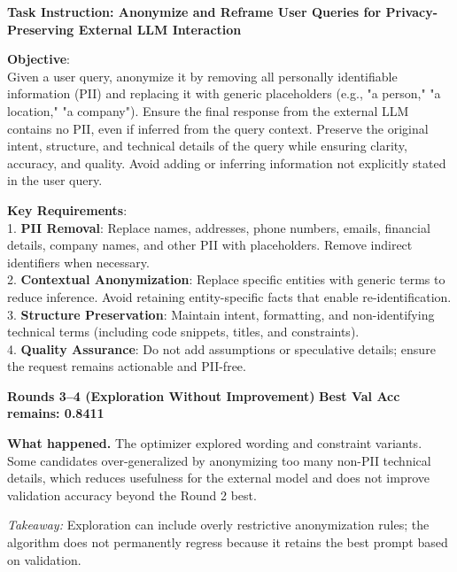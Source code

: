 \begin{prompttext}
\textbf{Task Instruction: Anonymize and Reframe User Queries for Privacy-Preserving External LLM Interaction}

\textbf{Objective}: \\
Given a user query, anonymize it by removing all personally identifiable information (PII) and replacing it with generic placeholders (e.g., "a person," "a location," "a company"). Ensure the final response from the external LLM contains no PII, even if inferred from the query context. Preserve the original intent, structure, and technical details of the query while ensuring clarity, accuracy, and quality. Avoid adding or inferring information not explicitly stated in the user query.

\textbf{Key Requirements}: \\
1. \textbf{PII Removal}: Replace names, addresses, phone numbers, emails, financial details, company names, and other PII with placeholders. Remove indirect identifiers when necessary. \\
2. \textbf{Contextual Anonymization}: Replace specific entities with generic terms to reduce inference. Avoid retaining entity-specific facts that enable re-identification. \\
3. \textbf{Structure Preservation}: Maintain intent, formatting, and non-identifying technical terms (including code snippets, titles, and constraints). \\
4. \textbf{Quality Assurance}: Do not add assumptions or speculative details; ensure the request remains actionable and PII-free.
\end{prompttext}

\begin{roundbox}
\textbf{Rounds 3--4 (Exploration Without Improvement)} \hfill \textbf{Best Val Acc remains: 0.8411}
\end{roundbox}

\noindent \textbf{What happened.} The optimizer explored wording and constraint variants. Some candidates over-generalized by anonymizing too many non-PII technical details, which reduces usefulness for the external model and does not improve validation accuracy beyond the Round 2 best.

\begin{prompttext}
\textit{Takeaway:} Exploration can include overly restrictive anonymization rules; the algorithm does not permanently regress because it retains the best prompt based on validation.
\end{prompttext}


